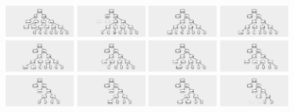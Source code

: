 \documentclass{article}
\begin{document}
\begin{figure}
\begin{center}
\includegraphics[width=1in]{../board/pics/ss851.png}
\includegraphics[width=1in]{../board/pics/ss901.png}
\includegraphics[width=1in]{../board/pics/ss951.png}
\includegraphics[width=1in]{../board/pics/ss1001.png}
\includegraphics[width=1in]{../board/pics/ss1051.png}
\includegraphics[width=1in]{../board/pics/ss1101.png}
\includegraphics[width=1in]{../board/pics/ss1151.png}
\includegraphics[width=1in]{../board/pics/ss1201.png}
\includegraphics[width=1in]{../board/pics/ss1251.png}
\includegraphics[width=1in]{../board/pics/ss1301.png}
\includegraphics[width=1in]{../board/pics/ss1351.png}
\includegraphics[width=1in]{../board/pics/ss1401.png}

\end{center}
\end{figure}
\end{document}

